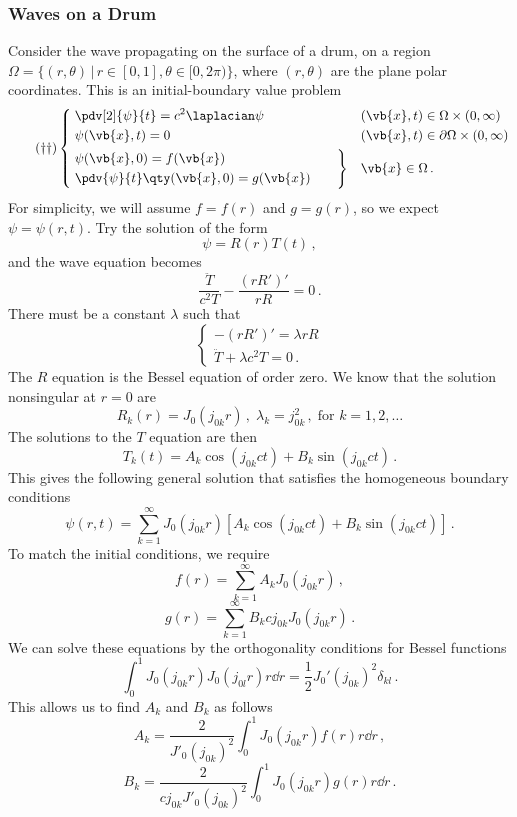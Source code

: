 \documentclass{article}
\theoremstyle{plain}\theoremheaderfont{\normalfont\itshape}\theorembodyfont{\rmfamily}\theoremseparator{.}\newtheorem*{rem}{Remark}\newtheorem*{ex}{Example}\newtheorem*{proof}{Proof}\newtheorem*{altp}{Alternative proof}
\theoremstyle{plain}\theoremheaderfont{\normalfont\bfseries}\theorembodyfont{\rmfamily}\theoremseparator{.}\newtheorem{thm}{Theorem}[section]\newtheorem{lem}[thm]{Lemma}\newtheorem{prop}[thm]{Proposition}\newtheorem*{cor}{Corollary}\newtheorem{defn}[thm]{Definition}\newtheorem{clm}[thm]{Claim}\newtheorem{clminproof}{Claim}
\theoremstyle{break}\theoremheaderfont{\normalfont\itshape}\theorembodyfont{\rmfamily}\theoremseparator{.\medskip}\newtheorem*{proofskip}{Proof}\newtheorem*{exs}{Examples}\newtheorem*{rems}{Remarks}
\theoremstyle{break}\theoremheaderfont{\normalfont\bfseries}\theorembodyfont{\rmfamily}\theoremseparator{.\medskip}\newtheorem{lemskip}[thm]{Lemma}\newtheorem{defnskip}[thm]{Definition}\newtheorem{propskip}[thm]{Proposition}\newtheorem{thmskip}[thm]{Theorem}
\numberwithin{equation}{section}
\begin{document}
	\subsubsection{Waves on a Drum}
	Consider the wave propagating on the surface of a drum, on a region \(\Omega=\{(r,\theta)\,|\,r\in[0,1],\theta\in[0,2\pi)\}\), where \((r,\theta)\) are the plane polar coordinates. This is an initial-boundary value problem
	\begin{equation}\tag{\(\dagger\dagger\)}
		\left\{\begin{aligned}
			& \;\pdv[2]{\psi}{t}=c^2\laplacian \psi && (\vb{x},t)\in\Omega\times(0,\infty)\\
			& \;\psi(\vb{x},t)=0 && (\vb{x},t)\in\partial\Omega\times(0,\infty)\\
			& \left.\begin{aligned}
				& \psi(\vb{x},0)=f(\vb{x})\\
				& \pdv{\psi}{t}\qty(\vb{x},0)=g(\vb{x})
			\end{aligned}\qquad\right\} && \vb{x}\in\Omega\,.
		\end{aligned}\right.
	\end{equation}
	For simplicity, we will assume \(f=f(r)\) and \(g=g(r)\), so we expect \(\psi=\psi(r,t)\). Try the solution of the form
	\[\psi=R(r)T(t)\,,\]
	and the wave equation becomes
	\[\frac{\ddot{T}}{c^2T}-\frac{(rR')'}{rR}=0\,.\]
	There must be a constant \(\lambda\) such that
	\[\begin{cases}
		-(rR')'=\lambda rR\\
		\ddot{T}+\lambda c^2T=0\,.
	\end{cases}\]
	The \(R\) equation is the Bessel equation of order zero. We know that the solution nonsingular at \(r=0\) are
	\[R_k(r)=J_0(j_{0k}r)\,,\;\lambda_k=j_{0k}^2\,,\;\text{for }k=1,2,\dots\]
	The solutions to the \(T\) equation are then
	\[T_k(t)=A_k\cos(j_{0k}ct)+B_k\sin(j_{0k}ct)\,.\]
	This gives the following general solution that satisfies the homogeneous boundary conditions
	\[\psi(r,t)=\sum_{k=1}^{\infty}J_0(j_{0k}r)[A_k\cos(j_{0k}ct)+B_k\sin(j_{0k}ct)]\,.\]
	To match the initial conditions, we require
	\[f(r)=\sum_{k=1}^{\infty}A_kJ_0(j_{0k}r)\,,\]
	\[g(r)=\sum_{k=1}^{\infty}B_kcj_{0k}J_0(j_{0k}r)\,.\]
	We can solve these equations by the orthogonality conditions for Bessel functions
	\[\int_{0}^{1}J_0(j_{0k}r)J_0(j_{0l}r)r\dd{r}=\frac{1}{2}J_0'(j_{0k})^2\delta_{kl}\,.\]
	This allows us to find \(A_k\) and \(B_k\) as follows
	\[A_k=\frac{2}{J'_0(j_{0k})^2}\int_{0}^{1}J_0(j_{0k}r)f(r)r\dd{r}\,,\]
	\[B_k=\frac{2}{cj_{0k}J'_0(j_{0k})^2}\int_{0}^{1}J_0(j_{0k}r)g(r)r\dd{r}\,.\]
\end{document}
